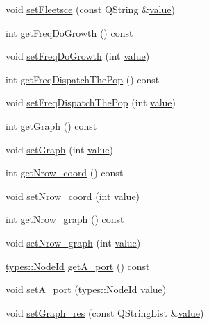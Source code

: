 \begin{DoxyCompactItemize}
void \mbox{\hyperlink{class_scenario_a844243b97ea3379ac732b9ed83b125c2}{set\+Fleetsce}} (const Q\+String \&\mbox{\hyperlink{diffusion_8cpp_a4b41795815d9f3d03abfc739e666d5da}{value}})
\item 
int \mbox{\hyperlink{class_scenario_afcb4b66511530fe16514ac36fcd6395f}{get\+Freq\+Do\+Growth}} () const
\item 
void \mbox{\hyperlink{class_scenario_ad4551c426ceed3de0e61e2f56d290602}{set\+Freq\+Do\+Growth}} (int \mbox{\hyperlink{diffusion_8cpp_a4b41795815d9f3d03abfc739e666d5da}{value}})
\item 
int \mbox{\hyperlink{class_scenario_abc85a61b51a0b7a309af46eb016ce634}{get\+Freq\+Dispatch\+The\+Pop}} () const
\item 
void \mbox{\hyperlink{class_scenario_a584dc97a715adbf8a2402287b4570b9c}{set\+Freq\+Dispatch\+The\+Pop}} (int \mbox{\hyperlink{diffusion_8cpp_a4b41795815d9f3d03abfc739e666d5da}{value}})
\item 
int \mbox{\hyperlink{class_scenario_a39c4892bb1bc3dfe8798ed84d31a6dce}{get\+Graph}} () const
\item 
void \mbox{\hyperlink{class_scenario_a003bf6a0de1125e13ab878708a989eb4}{set\+Graph}} (int \mbox{\hyperlink{diffusion_8cpp_a4b41795815d9f3d03abfc739e666d5da}{value}})
\item 
int \mbox{\hyperlink{class_scenario_aca9437e372aeac639be285952d401b0c}{get\+Nrow\+\_\+coord}} () const
\item 
void \mbox{\hyperlink{class_scenario_a2ad9ad85be68c1b472b26629e3cd94e5}{set\+Nrow\+\_\+coord}} (int \mbox{\hyperlink{diffusion_8cpp_a4b41795815d9f3d03abfc739e666d5da}{value}})
\item 
int \mbox{\hyperlink{class_scenario_ab237b4c511089a76c7c1cc7050c3d523}{get\+Nrow\+\_\+graph}} () const
\item 
void \mbox{\hyperlink{class_scenario_a9c9a2e9e2e0416afb577905979d8dae1}{set\+Nrow\+\_\+graph}} (int \mbox{\hyperlink{diffusion_8cpp_a4b41795815d9f3d03abfc739e666d5da}{value}})
\item 
\mbox{\hyperlink{classtypes_1_1_node_id}{types\+::\+Node\+Id}} \mbox{\hyperlink{class_scenario_a13f4e688978c9e87d497f8618b695668}{get\+A\+\_\+port}} () const
\item 
void \mbox{\hyperlink{class_scenario_a336d8bc6adc7aef5c764d461d43ed4a6}{set\+A\+\_\+port}} (\mbox{\hyperlink{classtypes_1_1_node_id}{types\+::\+Node\+Id}} \mbox{\hyperlink{diffusion_8cpp_a4b41795815d9f3d03abfc739e666d5da}{value}})
\item 
void \mbox{\hyperlink{class_scenario_a056129b9812ee7817847fb987e3e0205}{set\+Graph\+\_\+res}} (const Q\+String\+List \&\mbox{\hyperlink{diffusion_8cpp_a4b41795815d9f3d03abfc739e666d5da}{value}})

\end{DoxyCompactItemize}
